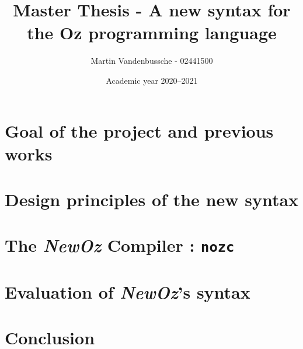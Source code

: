 \documentclass[a4paper,12pt]{scrreprt}
\title{Master Thesis - A new syntax for the Oz programming language}
\author{Martin Vandenbussche - 02441500}
\date{Academic year 2020--2021}
\begin{document}
\maketitle



\begin{comment}
Section 1.1 Contexte et problème
Section 1.2: Inspirations
1.2.1: Scala
1.2.2 Ozma
1.2.3 Jean-Pacifique
Section 1.3 Contributions
1.3.1 Adaptation du travail Jean-Pacifique
1.3.2 NewOz compiler
1.3.3 Community feedback
Section 1.4 Final conclusion on new syntax

chap 2 -> Design principles + my april syntax

chap 3 -> nozc compiler

chap 4 -> community feedback
Comprend  une conclusion qui donne une syntaxe newOz finale avec ton expérience y compris feedback de la communauté

chap 5 -> résumé du processus complet

Appendices : grammar, translations exmaples of Oz to NewOz, tutorial/doc from GitHub
\end{comment}

\tableofcontents


\chapter{Goal of the project and previous works}\label{ch:1}


\chapter{Design principles of the new syntax}\label{ch:2}


\chapter{The \textit{NewOz} Compiler : \texttt{nozc}}\label{ch:3}


\chapter{Evaluation of \textit{NewOz}'s syntax}\label{ch:4}


\chapter{Conclusion}\label{ch:5}

\end{document}
